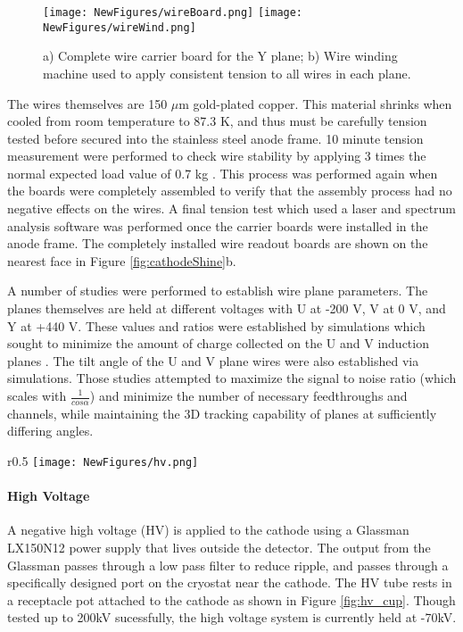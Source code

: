 \documentclass[12pt]{article}
\begin{document}
\begin{figure}[h!]
\centering
\texttt{[image: NewFigures/wireBoard.png]}
\hspace{3 mm} 
\texttt{[image: NewFigures/wireWind.png]}
\caption{ a) Complete wire carrier board for the Y plane; b) Wire winding machine used to apply consistent tension to all wires in each plane. }
\label{fig:wire_stuff}
\end{figure}

\par The wires themselves are 150 $\mu$m gold-plated copper.  This material shrinks when cooled from room temperature to 87.3 K, and thus must be carefully tension tested before secured into the stainless steel anode frame. 10 minute tension measurement were performed to check wire stability by applying 3 times the normal expected load value of 0.7 kg \cite{bib:uboone_JINST}.  This process was performed again when the boards were completely assembled to verify that the assembly process had no negative effects on the wires. A final tension test which used a laser and spectrum analysis software was performed once the carrier boards were installed in the anode frame. The completely installed wire readout boards are shown on the nearest face in Figure \ref{fig:cathodeShine}b.

\par A number of studies were performed to establish wire plane parameters. The planes themselves are held at different voltages with U at -200 V, V at 0 V, and Y at +440 V.  These values and ratios were established by simulations which sought to minimize the amount of charge collected on the U and V induction planes \cite{bib:uboone_proposal} \cite{bib:tdr}.  The tilt angle of the U and V plane wires were also established via simulations.  Those studies attempted to maximize the signal to noise ratio (which scales with $\frac{1}{cos\alpha}$) and minimize the number of necessary feedthroughs and channels, while maintaining the 3D tracking capability of planes at sufficiently differing angles.

\begin{wrapfigure}{r}{0.5\textwidth}
\centering
\texttt{[image: NewFigures/hv.png]}
\caption{ MicroBooNE HV feedthrough resting in the receptacle cup attached to the cathode. } 
\label{fig:hv_cup}
\end{wrapfigure}

\paragraph{High Voltage}
\par A negative high voltage (HV) is applied to the cathode using a Glassman LX150N12 power supply that lives outside the detector.  The output from the Glassman passes through a low pass filter to reduce ripple, and passes through a specifically designed port on the cryostat near the cathode.  The HV tube rests in a receptacle pot attached to the cathode as shown in Figure \ref{fig:hv_cup}.
\noindent Though tested up to 200kV sucessfully, the high voltage system is currently held at -70kV.
\end{document}
